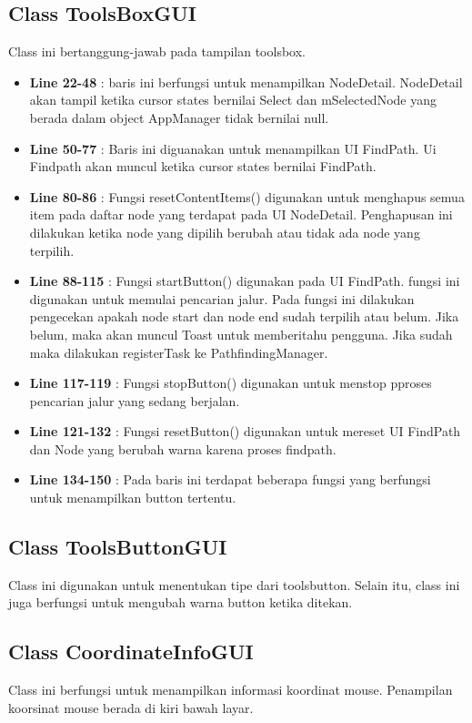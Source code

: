 \documentclass[12pt,a4paper,oneside]{article}
\begin{document}
\subsection{Class ToolsBoxGUI}
Class ini bertanggung-jawab pada tampilan toolsbox.
\begin{itemize}
	\item \textbf{Line 22-48} : baris ini berfungsi untuk menampilkan NodeDetail. NodeDetail akan tampil ketika cursor states bernilai Select dan mSelectedNode yang berada dalam object AppManager tidak bernilai null.
	\item \textbf{Line 50-77} : Baris ini diguanakan untuk menampilkan UI FindPath. Ui Findpath akan muncul ketika cursor states bernilai FindPath.
	\item \textbf{Line 80-86} : Fungsi resetContentItems() digunakan untuk menghapus semua item pada daftar node yang terdapat pada UI NodeDetail. Penghapusan ini dilakukan ketika node yang dipilih berubah atau tidak ada node yang terpilih.
	\item \textbf{Line 88-115} : Fungsi startButton() digunakan pada UI FindPath. fungsi ini digunakan untuk memulai pencarian jalur. Pada fungsi ini dilakukan pengecekan apakah node start dan node end sudah terpilih atau belum. Jika belum, maka akan muncul Toast untuk memberitahu pengguna. Jika sudah maka dilakukan registerTask ke PathfindingManager. 
	\item \textbf{Line 117-119} : Fungsi stopButton() digunakan untuk menstop pproses pencarian jalur yang sedang berjalan.
	\item \textbf{Line 121-132} : Fungsi resetButton() digunakan untuk mereset UI FindPath dan Node yang berubah warna karena proses findpath.
	\item \textbf{Line 134-150} : Pada baris ini terdapat beberapa fungsi yang berfungsi untuk menampilkan button tertentu. 
\end{itemize}
\subsection{Class ToolsButtonGUI}
Class ini digunakan untuk menentukan tipe dari toolsbutton. Selain itu, class ini juga berfungsi untuk mengubah warna button ketika ditekan.
\subsection{Class CoordinateInfoGUI}
Class ini berfungsi untuk menampilkan informasi koordinat mouse. Penampilan koorsinat mouse berada di kiri bawah layar.
\end{document}
